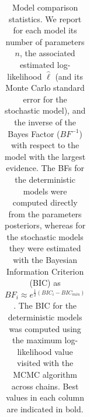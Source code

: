 \begin{table}[h!]
\begin{tabular}{lcccccccc}
   \bottomrule
\end{tabular}
\caption{Model comparison statistics. We report for each model its number of parameters $n$, the associated estimated log-likelihood $\hat{\ell}$ (and its Monte Carlo standard error for the stochastic model), and the inverse of the Bayes Factor ($BF^{-1}$) with respect to the model with the largest evidence. The BFs for the deterministic models were computed directly from the parameters posteriors, whereas for the stochastic models they were estimated with the Bayesian Information Criterion (BIC) as $BF_{i} \approx e^{\frac{1}{2} \left( BIC_i - BIC_{min}\right)}$. The BIC for the deterministic models was computed using the maximum log-likelihood value visited with the MCMC algorithm across chains. Best values in each column are indicated in bold.}\label{tab:stats}
\end{table}

